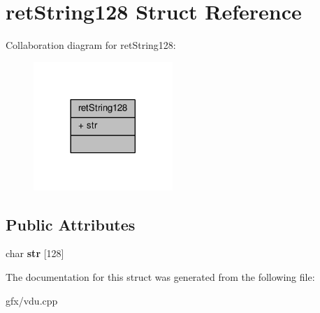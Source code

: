 \hypertarget{structretString128}{}\section{ret\+String128 Struct Reference}
\label{structretString128}


Collaboration diagram for ret\+String128\+:
\nopagebreak
\begin{figure}[H]
\begin{center}
\leavevmode
\includegraphics[width=149pt]{db/d27/structretString128__coll__graph}
\end{center}
\end{figure}
\subsection*{Public Attributes}
\begin{DoxyCompactItemize}
\item 
char {\bfseries str} \mbox{[}128\mbox{]}\hypertarget{structretString128_a79a530a574d5ad5ae2b65e833cab9e72}{}\label{structretString128_a79a530a574d5ad5ae2b65e833cab9e72}

\end{DoxyCompactItemize}


The documentation for this struct was generated from the following file\+:\begin{DoxyCompactItemize}
\item 
gfx/vdu.\+cpp\end{DoxyCompactItemize}
